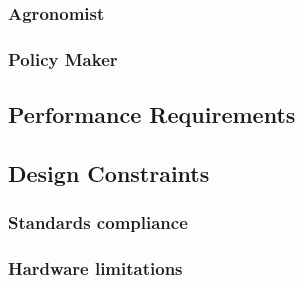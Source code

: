 \subsubsection{Agronomist}










\subsubsection{Policy Maker}
%






%

% 


\subsection{Performance Requirements}
\subsection{Design Constraints}
\subsubsection{Standards compliance}
\subsubsection{Hardware limitations}
